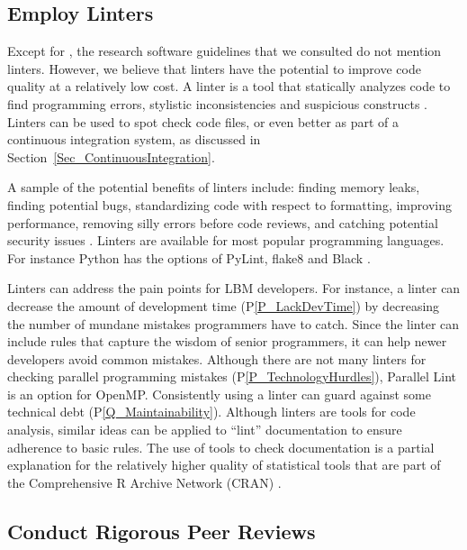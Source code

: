 \documentclass[final, 3p, times, authoryear]{elsarticle}
\newcommand{\ppref}[1]{P\ref{#1}}
\begin{document}
\subsection{Employ Linters} \label{Sec_Linters}

Except for \citet{ThielEtAl2020}, the research software guidelines that we
consulted do not mention linters.  However, we believe that linters have the
potential to improve code quality at a relatively low cost.  A linter is a tool
that statically analyzes code to find programming errors, stylistic
inconsistencies and suspicious constructs \citep{Wikipedia2022_Lint}. Linters
can be used to spot check code files, or even better as part of a continuous
integration system, as discussed in Section~\ref{Sec_ContinuousIntegration}.  

A sample of the potential benefits of linters include: finding memory leaks,
finding potential bugs, standardizing code with respect to formatting, improving
performance, removing silly errors before code reviews, and catching potential
security issues \citep{SourceLevel2022_Lint}.  Linters are available for most
popular programming languages.  For instance Python has the options of PyLint,
flake8 and Black \citep{Zadka2018}.

Linters can address the pain points for LBM developers.  For instance, a linter
can decrease the amount of development time (\ppref{P_LackDevTime}) by
decreasing the number of mundane mistakes programmers have to catch.  Since the
linter can include rules that capture the wisdom of senior programmers, it can
help newer developers avoid common mistakes. Although there are not many linters
for checking parallel programming mistakes (\ppref{P_TechnologyHurdles}),
Parallel Lint is an option for OpenMP. Consistently using a linter can guard
against some technical debt (\ppref{Q_Maintainability}). Although linters are
tools for code analysis, similar ideas can be applied to ``lint'' documentation
to ensure adherence to basic rules.  The use of tools to check documentation is
a partial explanation for the relatively higher quality of statistical tools
that are part of the Comprehensive R Archive Network (CRAN)
\citep{SmithEtAl2018_StatSoft}.

\subsection{Conduct Rigorous Peer Reviews} \label{Sec_PeerReview}
\end{document}
